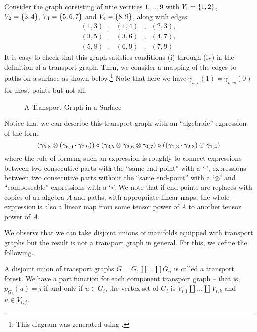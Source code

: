 \documentclass[./Thick_TQFTs_and_Quantum_Information.tex]{subfiles}
\begin{document}
\begin{exm}
Consider the graph consisting of nine vertices $1, \dots, 9$ with
$V_1 = \set{1, 2}$, $V_2 = \set{3, 4}$, $V_4 = \set{5, 6, 7}$ and
$V_4 = \set{8, 9}$, along with edges:
\[\begin{array}{ccccc}
  (1, 3) &,& (1, 4) &,& (2, 3),\\
  (3, 5) &,& (3, 6) &,& (4, 7),\\
  (5, 8) &,& (6, 9) &,& (7, 9)
\end{array}\]
It is easy to check that this graph satisfies conditions (i) through (iv) in the
definition of a transport graph. Then, we consider a mapping of the edges to
paths on a surface as shown below.\footnote{This diagram was generated using
\cite{Mathcha}.} Note that here we have $\gamma_{u, v}(1) = \gamma_{v, w}(0)$ for
most points but not all.
\begin{figure}[H]
\begin{center}

\end{center}
\caption{A Transport Graph in a Surface}
\end{figure}
Notice that we can describe this transport graph with an ``algebraic''
expression of the form:
\[
  (\gamma_{5, 8} \otimes (\gamma_{6, 9} \cdot \gamma_{7, 9})) \circ
  (\gamma_{3, 5} \otimes \gamma_{3, 6} \otimes \gamma_{4, 7}) \circ
  ((\gamma_{1, 3} \cdot \gamma_{2, 3}) \otimes \gamma_{1, 4})
\]
where the rule of forming such an expression is roughly to connect
expressions between two consecutive parts with the ``same end point'' with a
`$\cdot$', expressions between two consecutive parts without the
``same end-point'' with a `$\otimes$' and ``composeable'' expressions with a
`$\circ$'. We note that if end-points are replaces with copies of an algebra $A$
and paths, with appropriate linear maps, the whole expression is also a linear
map from some tensor power of $A$ to another tensor power of $A$.
\end{exm}

We observe that we can take disjoint unions of manifolds equipped with transport
graphs but the result is not a transport graph in general. For this, we define
the following.

\begin{defn}
A disjoint union of transport graphs $G = G_1 \amalg \dots \amalg G_n$ is called
a transport forest. We have a part function for each component transport graph --
that is, $p_{G_i}(u) = j$ if and only if $u \in G_i$, the vertex set of $G_i$ is
$V_{i, 1} \amalg \dots \amalg V_{i, k}$ and $u \in V_{i, j}$.
\end{defn}
\end{document}
